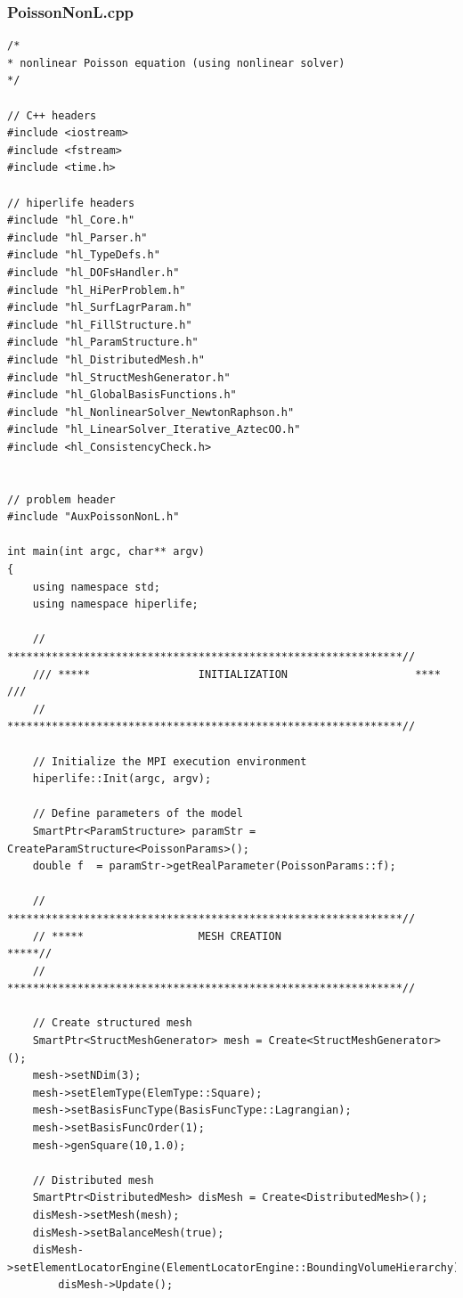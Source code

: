 \documentclass[]{article}
\begin{document}
\subsubsection{PoissonNonL.cpp} \label{sec: m.cpp}
\nolinenumbers
\begin{lstlisting}
/*
* nonlinear Poisson equation (using nonlinear solver)
*/
	
// C++ headers
#include <iostream>
#include <fstream>
#include <time.h>
	
// hiperlife headers
#include "hl_Core.h"
#include "hl_Parser.h"
#include "hl_TypeDefs.h"  
#include "hl_DOFsHandler.h"
#include "hl_HiPerProblem.h"
#include "hl_SurfLagrParam.h"
#include "hl_FillStructure.h"
#include "hl_ParamStructure.h"
#include "hl_DistributedMesh.h" 
#include "hl_StructMeshGenerator.h" 
#include "hl_GlobalBasisFunctions.h"
#include "hl_NonlinearSolver_NewtonRaphson.h"
#include "hl_LinearSolver_Iterative_AztecOO.h"
#include <hl_ConsistencyCheck.h>
	
	
// problem header
#include "AuxPoissonNonL.h"
	
int main(int argc, char** argv)
{
	using namespace std;
	using namespace hiperlife;
		
	// **************************************************************//
	/// *****                 INITIALIZATION                    **** ///
	// **************************************************************//
		
	// Initialize the MPI execution environment
	hiperlife::Init(argc, argv);
		
	// Define parameters of the model
	SmartPtr<ParamStructure> paramStr = CreateParamStructure<PoissonParams>();
	double f  = paramStr->getRealParameter(PoissonParams::f);
		
	// **************************************************************//
	// *****                  MESH CREATION                     *****//
	// **************************************************************//
		
	// Create structured mesh
	SmartPtr<StructMeshGenerator> mesh = Create<StructMeshGenerator>();
	mesh->setNDim(3);
	mesh->setElemType(ElemType::Square);
	mesh->setBasisFuncType(BasisFuncType::Lagrangian);
	mesh->setBasisFuncOrder(1);
	mesh->genSquare(10,1.0);
		
	// Distributed mesh
	SmartPtr<DistributedMesh> disMesh = Create<DistributedMesh>();
	disMesh->setMesh(mesh);
	disMesh->setBalanceMesh(true);
	disMesh->setElementLocatorEngine(ElementLocatorEngine::BoundingVolumeHierarchy);
		disMesh->Update();
		

\end{lstlisting}
\end{document}

